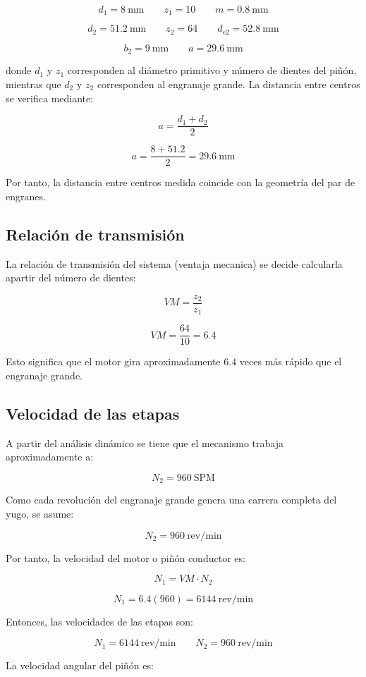 \documentclass[12pt,letterpaper]{article}
\begin{document}
\[
d_1 = 8 \ \text{mm}
\qquad
z_1 = 10
\qquad
m = 0.8 \ \text{mm}
\]

\[
d_2 = 51.2 \ \text{mm}
\qquad
z_2 = 64
\qquad
d_{e2} = 52.8 \ \text{mm}
\]

\[
b_2 = 9 \ \text{mm}
\qquad
a = 29.6 \ \text{mm}
\]

donde \(d_1\) y \(z_1\) corresponden al diámetro primitivo y número de dientes del piñón, mientras que \(d_2\) y \(z_2\) corresponden al engranaje grande. La distancia entre centros se verifica mediante:

\[
a=\frac{d_1+d_2}{2}
\]

\[
a=\frac{8+51.2}{2}=29.6 \ \text{mm}
\]

Por tanto, la distancia entre centros medida coincide con la geometría del par de engranes.

\subsection{Relación de transmisión}

La relación de transmisión del sistema (ventaja mecanica) se decide calcularla apartir del número de dientes:

\[
VM=\frac{z_2}{z_1}
\]

\[
VM=\frac{64}{10}=6.4
\]

Esto significa que el motor gira aproximadamente \(6.4\) veces más rápido que el engranaje grande.

\subsection{Velocidad de las etapas}

A partir del análisis dinámico se tiene que el mecanismo trabaja aproximadamente a:

\[
N_2=960 \ \text{SPM}
\]

Como cada revolución del engranaje grande genera una carrera completa del yugo, se asume:

\[
N_2=960 \ \text{rev/min}
\]

Por tanto, la velocidad del motor o piñón conductor es:

\[
N_1=VM\cdot N_2
\]

\[
N_1=6.4(960)=6144 \ \text{rev/min}
\]

Entonces, las velocidades de las etapas son:

\[
N_1=6144 \ \text{rev/min}
\qquad
N_2=960 \ \text{rev/min}
\]

La velocidad angular del piñón es:
\end{document}
